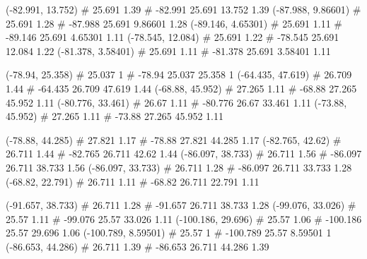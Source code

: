\documentclass[a4paper,openbib,10pt]{article}
\newenvironment{treegraph}{\begin{graph}}{\end{graph}}
\begin{document}
\begin{treegraph}
  (-82.991, 13.752) #     25.691    1.39
   #    -82.991    25.691    13.752    1.39
  (-87.988, 9.86601) #     25.691    1.28
   #    -87.988    25.691    9.86601    1.28
  (-89.146, 4.65301) #     25.691    1.11
   #    -89.146    25.691    4.65301    1.11
  (-78.545, 12.084) #     25.691    1.22
   #    -78.545    25.691    12.084    1.22
  (-81.378, 3.58401) #     25.691    1.11
   #    -81.378    25.691    3.58401    1.11

  (-78.94, 25.358) #     25.037    1
   #    -78.94    25.037    25.358    1
  (-64.435, 47.619) #     26.709    1.44
   #    -64.435    26.709    47.619    1.44
  (-68.88, 45.952) #     27.265    1.11
   #    -68.88    27.265    45.952    1.11
  (-80.776, 33.461) #     26.67    1.11
   #    -80.776    26.67    33.461    1.11
  (-73.88, 45.952) #     27.265    1.11
   #    -73.88    27.265    45.952    1.11

  (-78.88, 44.285) #     27.821    1.17
   #    -78.88    27.821    44.285    1.17
  (-82.765, 42.62) #     26.711    1.44
   #    -82.765    26.711    42.62    1.44
  (-86.097, 38.733) #     26.711    1.56
   #    -86.097    26.711    38.733    1.56
  (-86.097, 33.733) #     26.711    1.28
   #    -86.097    26.711    33.733    1.28
  (-68.82, 22.791) #     26.711    1.11
   #    -68.82    26.711    22.791    1.11

  (-91.657, 38.733) #     26.711    1.28
   #    -91.657    26.711    38.733    1.28
  (-99.076, 33.026) #     25.57    1.11
   #    -99.076    25.57    33.026    1.11
  (-100.186, 29.696) #     25.57    1.06
   #    -100.186    25.57    29.696    1.06
  (-100.789, 8.59501) #     25.57    1
   #    -100.789    25.57    8.59501    1
  (-86.653, 44.286) #     26.711    1.39
   #    -86.653    26.711    44.286    1.39


\end{treegraph}
\end{document}
